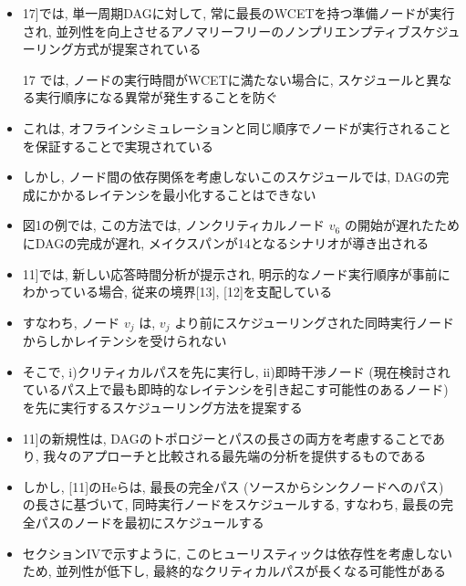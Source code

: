 \begin{frame}{}
    \begin{itemize}
        \item 17]では, 単一周期DAGに対して, 常に最長のWCETを持つ準備ノードが実行され, 並列性を向上させるアノマリーフリーのノンプリエンプティブスケジューリング方式が提案されている
        \item [17]では, ノードの実行時間がWCETに満たない場合に, スケジュールと異なる実行順序になる異常が発生することを防ぐ
        \item これは, オフラインシミュレーションと同じ順序でノードが実行されることを保証することで実現されている
        \item しかし, ノード間の依存関係を考慮しないこのスケジュールでは, DAGの完成にかかるレイテンシを最小化することはできない
        \item 図1の例では, この方法では, ノンクリティカルノード $v_{6}$ の開始が遅れたためにDAGの完成が遅れ, メイクスパンが14となるシナリオが導き出される
    \end{itemize}
\end{frame}

\begin{frame}{}
    \begin{itemize}
        \item 11]では, 新しい応答時間分析が提示され, 明示的なノード実行順序が事前にわかっている場合, 従来の境界[13], [12]を支配している
        \item すなわち, ノード $v_{j}$ は, $v_{j}$ より前にスケジューリングされた同時実行ノードからしかレイテンシを受けられない
        \item そこで, i)クリティカルパスを先に実行し, ii)即時干渉ノード (現在検討されているパス上で最も即時的なレイテンシを引き起こす可能性のあるノード) を先に実行するスケジューリング方法を提案する
    \end{itemize}
\end{frame}

\begin{frame}{}
    \begin{itemize}
        \item 11]の新規性は, DAGのトポロジーとパスの長さの両方を考慮することであり, 我々のアプローチと比較される最先端の分析を提供するものである
        \item しかし, [11]のHeらは, 最長の完全パス (ソースからシンクノードへのパス) の長さに基づいて, 同時実行ノードをスケジュールする, すなわち, 最長の完全パスのノードを最初にスケジュールする
        \item セクションIVで示すように, このヒューリスティックは依存性を考慮しないため, 並列性が低下し, 最終的なクリティカルパスが長くなる可能性がある
    \end{itemize}
\end{frame}
